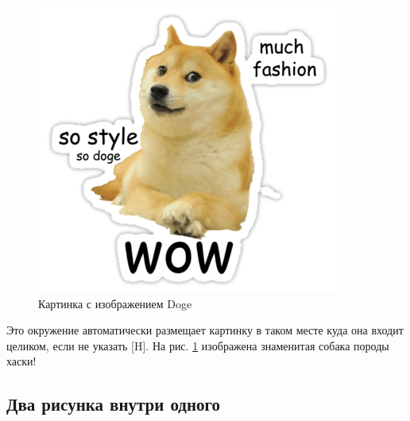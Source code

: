 \documentclass[12pt, a4paper]{article}
\begin{document}
\begin{figure}[H]
\begin{center}
\includegraphics[width=0.3\textheight]{doge.png}
\end{center}
\caption{Картинка с изображением Doge}\label{pic:doge}
\end{figure}

Это окружение автоматически размещает картинку в таком месте куда она входит целиком, если не указать [H].  На рис. \ref{pic:doge} изображена знаменитая собака породы хаски!


\subsection{Два рисунка внутри одного}
\end{document}
